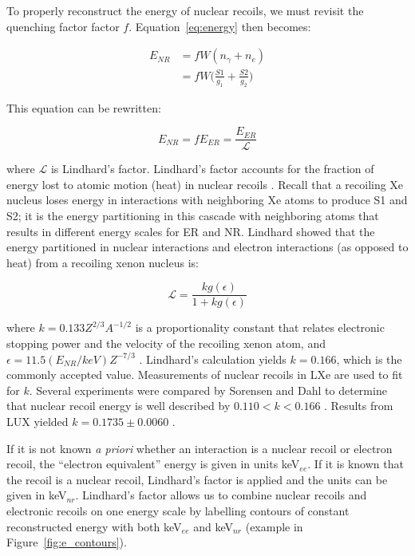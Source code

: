 To properly reconstruct the energy of nuclear recoils, we must revisit the quenching factor factor $f$. Equation~\ref{eq:energy} then becomes:

 \begin{equation}
 \begin{split}
E_{NR} &= f W (n_{\gamma} + n_{e} ) \\
   &= f W \Big(\frac{S1}{g_{1}} + \frac{S2}{g_{2}}\Big)
 \end{split}
\end{equation}

This equation can be rewritten:

 \begin{equation}
 \label{eq:combined_energy}
E_{NR} = f E_{ER} = \frac{E_{ER}}{\mathcal{L}}
\end{equation}

where $\mathcal{L}$ is Lindhard's factor. Lindhard's factor accounts for the fraction of energy lost to atomic motion (heat) in nuclear recoils \cite{Lindhard1963}. Recall that a recoiling Xe nucleus loses energy in interactions with neighboring Xe atoms to produce S1 and S2; it is the energy partitioning in this cascade with neighboring atoms that results in different energy scales for \ac{ER} and \ac{NR}. Lindhard showed that the energy partitioned in nuclear interactions and electron interactions (as opposed to heat) from a recoiling xenon nucleus is:

 \begin{equation}
 \label{eq:lindhard}
\mathcal{L} = \frac{k g(\epsilon)}{1 + k g(\epsilon)}
\end{equation}

where $k = 0.133 Z^{2/3} A^{-1/2}$ is a proportionality constant that relates electronic stopping power and the velocity of the recoiling xenon atom, and $\epsilon = 11.5 (E_{NR}/keV) Z^{-7/3}$ \cite{Lindhard1963}. Lindhard's calculation yields $k=0.166$, which is the commonly accepted value. Measurements of nuclear recoils in \ac{LXe} are used to fit for $k$. Several experiments were compared by Sorensen and Dahl to determine that nuclear recoil energy is well described by $0.110 < k < 0.166$ \cite{Sorensen2011}. Results from \ac{LUX} yielded $k = 0.1735 \pm 0.0060$ \cite{LUXDD}. 

If it is not known \textit{a priori} whether an interaction is a nuclear recoil or electron recoil, the ``electron equivalent'' energy is given in units keV$_{ee}$. If it is known that the recoil is a nuclear recoil, Lindhard's factor is applied and the units can be given in keV$_{nr}$. Lindhard's factor allows us to combine nuclear recoils and electronic recoils on one energy scale by labelling contours of constant reconstructed energy with both keV$_{ee}$ and keV$_{nr}$ (example in Figure~\ref{fig:e_contours}).


